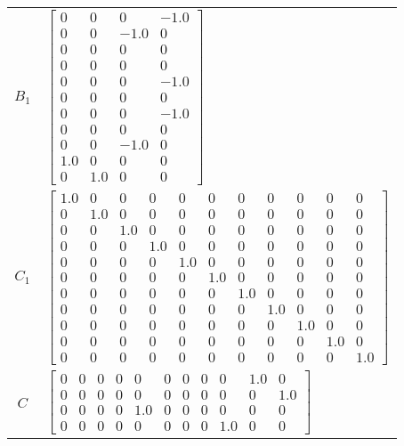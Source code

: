 \begin{tabular}{cl}
 $B_{1}$  & $\left[\begin{matrix}0 & 0 & 0 & -1.0\\0 & 0 & -1.0 & 0\\0 & 0 & 0 & 0\\0 & 0 & 0 & 0\\0 & 0 & 0 & -1.0\\0 & 0 & 0 & 0\\0 & 0 & 0 & -1.0\\0 & 0 & 0 & 0\\0 & 0 & -1.0 & 0\\1.0 & 0 & 0 & 0\\0 & 1.0 & 0 & 0\end{matrix}\right]$                                                                                                                                                                                                                                                                                                                                    \\
 $C_{1}$  & $\left[\begin{array}{ccccccccccc}1.0 & 0 & 0 & 0 & 0 & 0 & 0 & 0 & 0 & 0 & 0\\0 & 1.0 & 0 & 0 & 0 & 0 & 0 & 0 & 0 & 0 & 0\\0 & 0 & 1.0 & 0 & 0 & 0 & 0 & 0 & 0 & 0 & 0\\0 & 0 & 0 & 1.0 & 0 & 0 & 0 & 0 & 0 & 0 & 0\\0 & 0 & 0 & 0 & 1.0 & 0 & 0 & 0 & 0 & 0 & 0\\0 & 0 & 0 & 0 & 0 & 1.0 & 0 & 0 & 0 & 0 & 0\\0 & 0 & 0 & 0 & 0 & 0 & 1.0 & 0 & 0 & 0 & 0\\0 & 0 & 0 & 0 & 0 & 0 & 0 & 1.0 & 0 & 0 & 0\\0 & 0 & 0 & 0 & 0 & 0 & 0 & 0 & 1.0 & 0 & 0\\0 & 0 & 0 & 0 & 0 & 0 & 0 & 0 & 0 & 1.0 & 0\\0 & 0 & 0 & 0 & 0 & 0 & 0 & 0 & 0 & 0 & 1.0\end{array}\right]$  \\
   $C$    & $\left[\begin{array}{ccccccccccc}0 & 0 & 0 & 0 & 0 & 0 & 0 & 0 & 0 & 1.0 & 0\\0 & 0 & 0 & 0 & 0 & 0 & 0 & 0 & 0 & 0 & 1.0\\0 & 0 & 0 & 0 & 1.0 & 0 & 0 & 0 & 0 & 0 & 0\\0 & 0 & 0 & 0 & 0 & 0 & 0 & 0 & 1.0 & 0 & 0\end{array}\right]$                                                                                                                                                                                                                                                                                                                             \\

\end{tabular}

